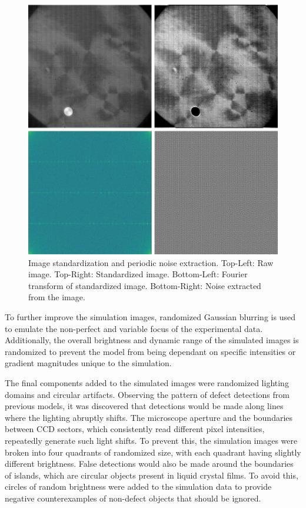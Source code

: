 \documentclass[prl,reprint,showpacs,floatfix,nofootinbib]{revtex4-1}
\begin{document}
\begin{figure}
  \includegraphics[width=\linewidth]{Standardizationandnoise.png}
  \caption{Image standardization and periodic noise extraction. Top-Left: Raw image. Top-Right: Standardized image. Bottom-Left: Fourier transform of standardized image. Bottom-Right: Noise extracted from the image.}
  \label{fig:Standardization and Noise}
\end{figure}

To further improve the simulation images, randomized Gaussian blurring is used to emulate the non-perfect and variable focus of the experimental data. Additionally, the overall brightness and dynamic range of the simulated images is randomized to prevent the model from being dependant on specific intensities or gradient magnitudes unique to the simulation.

The final components added to the simulated images were randomized lighting domains and circular artifacts. Observing the pattern of defect detections from previous models, it was discovered that detections would be made along lines where the lighting abruptly shifts. The microscope aperture and the boundaries between CCD sectors, which consistently read different pixel intensities, repeatedly generate such light shifts. To prevent this, the simulation images were broken into four quadrants of randomized size, with each quadrant having slightly different brightness. False detections would also be made around the boundaries of islands, which are circular objects present in liquid crystal films. To avoid this, circles of random brightness were added to the simulation data to provide negative counterexamples of non-defect objects that should be ignored.
\end{document}
